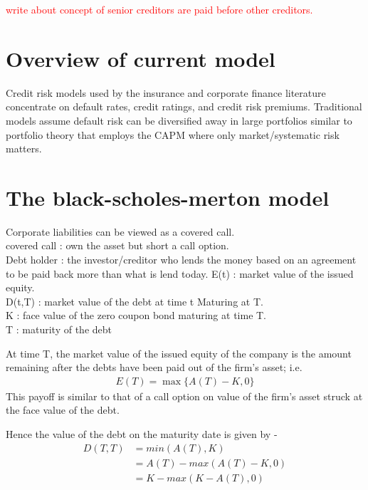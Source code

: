 \textcolor{red}{write about concept of senior creditors are paid before other creditors.}

\section{Overview of current model}
Credit risk models used by the insurance and corporate finance literature concentrate on default rates, credit ratings, and credit risk premiums. Traditional models assume default risk can be diversified away in large portfolios similar to portfolio theory that employs the CAPM where only market/systematic risk matters. 

\section{The black-scholes-merton model}
Corporate liabilities can be viewed as a covered call. \\
covered call : own the asset but short a call option.\\
Debt holder : the investor/creditor who lends the money based on an agreement to be paid back more than what is lend today.
E(t) : market value of the issued equity.\\
D(t,T) : market value of the debt at time t Maturing at T.\\
K : face value of the zero coupon bond maturing at time T.\\
T : maturity of the debt

At time T, the market value of the issued equity of the company is the amount remaining after the debts have been paid out of the firm's asset; i.e. 
\begin{align}
E(T) = \max\{A(T)-K, 0\}    
\end{align}
This payoff is similar to that of a call option on value of the firm's asset struck at the face value of the debt.

\par Hence the value of the debt on the maturity date is given by - 
\begin{align}
D(T,T) &= min(A(T),K) \\
&= A(T)-max(A(T)-K,0) \label{eq:interpretation1} \\
&= K-max(K-A(T),0) \label{eq:interpretation2}
\end{align}

